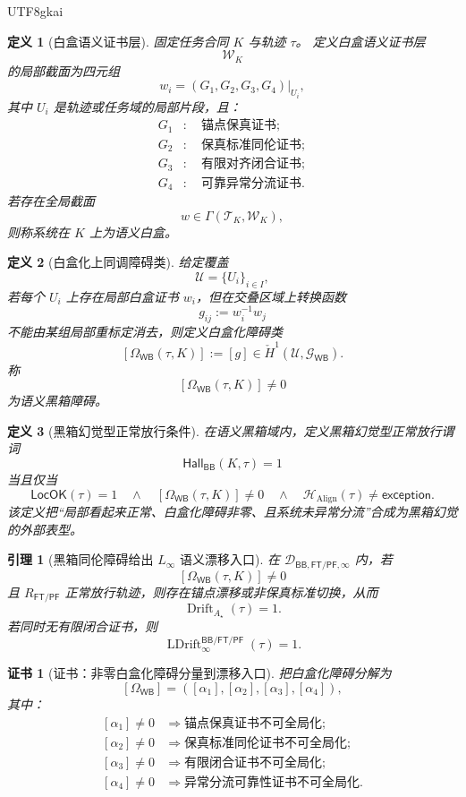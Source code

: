 \documentclass[12pt]{article}
\newtheorem{definition}{定义}[section]
\newtheorem{lemma}{引理}[section]
\newtheorem{Certificate}{证书}[section]
\newcommand{\Linfty}{\ensuremath{L_\infty}}
\newcommand{\LocOK}{\mathsf{LocOK}}
\newcommand{\Hall}{\mathsf{Hall}}
\newcommand{\Exc}{\mathsf{exception}}
\newcommand{\FTPF}{\mathsf{FT/PF}}
\newcommand{\BB}{\mathsf{BB}}
\newcommand{\WB}{\mathsf{WB}}
\newcommand{\Align}{\operatorname{Align}}
\newcommand{\Drift}{\operatorname{Drift}}
\newcommand{\LDrift}{\operatorname{LDrift}}
\begin{document}
\begin{CJK*}{UTF8}{gkai}
\begin{definition}[白盒语义证书层]
固定任务合同 \(K\) 与轨迹 \(\tau\)。
定义白盒语义证书层
\[
  \mathcal W_K
\]
的局部截面为四元组
\[
  w_i=(G_1,G_2,G_3,G_4)|_{U_i},
\]
其中 \(U_i\) 是轨迹或任务域的局部片段，且：
\[
\begin{aligned}
  G_1&:\quad \text{锚点保真证书};\\
  G_2&:\quad \text{保真标准同伦证书};\\
  G_3&:\quad \text{有限对齐闭合证书};\\
  G_4&:\quad \text{可靠异常分流证书}.
\end{aligned}
\]
若存在全局截面
\[
  w\in\Gamma(\mathcal T_K,\mathcal W_K),
\]
则称系统在 \(K\) 上为语义白盒。
\end{definition}

\begin{definition}[白盒化上同调障碍类]
给定覆盖
\[
  \mathcal U=\{U_i\}_{i\in I},
\]
若每个 \(U_i\) 上存在局部白盒证书 \(w_i\)，但在交叠区域上转换函数
\[
  g_{ij}:=w_i^{-1}w_j
\]
不能由某组局部重标定消去，则定义白盒化障碍类
\[
  [\Omega_{\WB}(\tau,K)]
  :=
  [g]
  \in
  \check{H}^{1}(\mathcal U,\mathcal G_{\WB}).
\]
称
\[
  [\Omega_{\WB}(\tau,K)]\ne 0
\]
为语义黑箱障碍。
\end{definition}

\begin{definition}[黑箱幻觉型正常放行条件]
\label{def:tex51-blackbox-hall-release}
在语义黑箱域内，定义黑箱幻觉型正常放行谓词
\[
  \Hall_{\BB}(K,\tau)=1
\]
当且仅当
\[
  \LocOK(\tau)=1
  \quad\wedge\quad
  [\Omega_{\WB}(\tau,K)]\ne0
  \quad\wedge\quad
  \mathcal H_{\Align}(\tau)\ne\Exc.
\]
该定义把“局部看起来正常、白盒化障碍非零、且系统未异常分流”合成为黑箱幻觉的外部表型。
\end{definition}

\begin{lemma}[黑箱同伦障碍给出 \texorpdfstring{\(\Linfty\)}{L-infinity} 语义漂移入口]
\label{lem:tex51-obstruction-to-linfty-drift}
在 \(\mathcal D_{\BB,\FTPF,\infty}\) 内，若
\[
  [\Omega_{\WB}(\tau,K)]\ne0
\]
且 \(R_{\FTPF}\) 正常放行轨迹，则存在锚点漂移或非保真标准切换，从而
\[
  \Drift_{A_\star}(\tau)=1.
\]
若同时无有限闭合证书，则
\[
  \LDrift_{\infty}^{\BB/\FTPF}(\tau)=1.
\]
\end{lemma}

\begin{Certificate}[证书：非零白盒化障碍分量到漂移入口]
\label{cert:tex51-obstruction-to-linfty-drift}
把白盒化障碍分解为
\[
  [\Omega_{\WB}]
  =
  ([\alpha_1],[\alpha_2],[\alpha_3],[\alpha_4]),
\]
其中：
\[
\begin{aligned}
  [\alpha_1]\ne0&\Rightarrow \text{锚点保真证书不可全局化};\\
  [\alpha_2]\ne0&\Rightarrow \text{保真标准同伦证书不可全局化};\\
  [\alpha_3]\ne0&\Rightarrow \text{有限闭合证书不可全局化};\\
  [\alpha_4]\ne0&\Rightarrow \text{异常分流可靠性证书不可全局化}.
\end{aligned}
\]
\end{Certificate}


\end{CJK*}
\end{document}
